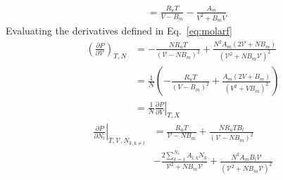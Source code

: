 \documentclass[11pt]{article}
\begin{document}
\begin{enumerate}
\begin{align}
	   & = \frac{R_u T}{V-B_m} - \frac{A_m}{V^2+B_m V}
    \end{align}
    Evaluating the derivatives defined in Eq.~\ref{eq:molarf}
    \begin{align}
    \left(\frac{\partial P}{\partial \mathcal{V}} \right)_{T,N} & = -\frac{N R_u T}{\left(\mathcal{V}-N B_m\right)^2} + \frac{N^2 A_m \left(2\mathcal{V} + N B_m \right)}{\left(\mathcal{V}^2+N B_m \mathcal{V} \right)^2} \nonumber  \\
                & = \frac{1}{N} \left(-\frac{R_u T}{\left(V-B_m \right)^2} + \frac{A_m\left(2V+B_m\right)}{\left(V^2 + V B_m\right)^2}\right) \\
                & = \frac{1}{N} \left . \frac{\partial P}{\partial V} \right |_{T,X}
    \end{align}
    \begin{align} 
     \left . \frac{\partial P}{\partial N_{l}} \right |_{T,\mathcal{V},N_{k,k\neq l}} &=  \frac{R_u T}{\mathcal{V}-N B_m} + \frac{N R_u T B_l}{\left(\mathcal{V}-N B_m\right)^2} \\
     &- \frac{2 \sum_{k=1}^{N_s} A_{l,k} N_{k}}{\mathcal{V}^2 + N B_m \mathcal{V}} + \frac{N^2 A_m B_l \mathcal{V}}{\left(\mathcal{V}^2 + N B_m \mathcal{V} \right)^2}
    \end{align}
    
\end{enumerate}

\end{document}
